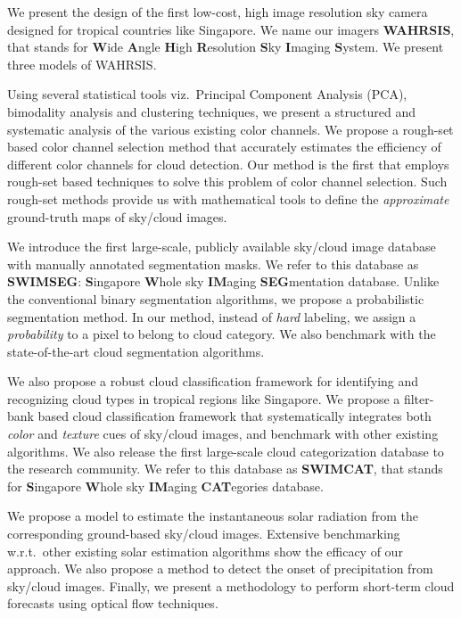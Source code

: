 We present the design of the first low-cost, high image resolution sky camera designed for tropical countries like Singapore. We name our imagers \textbf{WAHRSIS}, that stands for \textbf{W}ide \textbf{A}ngle \textbf{H}igh \textbf{R}esolution \textbf{S}ky \textbf{I}maging \textbf{S}ystem. We present three models of WAHRSIS.

Using several statistical tools viz.\ Principal Component Analysis (PCA), bimodality analysis and clustering techniques, we present a structured and systematic analysis of the various existing color channels. We propose a rough-set based color channel selection method that accurately estimates the efficiency of different color channels for cloud detection. Our method is the first that employs rough-set based techniques to solve this problem of color channel selection. Such rough-set methods provide us with mathematical tools to define the \emph{approximate} ground-truth maps of sky/cloud images.

We introduce the first large-scale, publicly available sky/cloud image database with manually annotated segmentation masks. We refer to this database as \textbf{SWIMSEG}: \textbf{S}ingapore \textbf{W}hole sky \textbf{IM}aging \textbf{SEG}mentation database. Unlike the conventional binary segmentation algorithms, we propose a probabilistic segmentation method. In our method, instead of \emph{hard} labeling, we assign a \emph{probability} to a pixel to belong to cloud category. We also benchmark with the state-of-the-art cloud segmentation algorithms. 

We also propose a robust cloud classification framework for identifying and recognizing cloud types in tropical regions like Singapore. We propose a filter-bank based cloud classification framework that systematically integrates both \emph{color} and \emph{texture} cues of sky/cloud images, and benchmark with other existing algorithms. We also release the first large-scale cloud categorization database to the research community. We refer to this database as \textbf{SWIMCAT}, that stands for \textbf{S}ingapore \textbf{W}hole sky \textbf{IM}aging \textbf{CAT}egories database.

We propose a model to estimate the instantaneous solar radiation from the corresponding ground-based sky/cloud images. Extensive benchmarking w.r.t.\ other existing solar estimation algorithms show the efficacy of our approach. We also propose a method to detect the onset of precipitation from sky/cloud images. Finally, we present a methodology to perform short-term cloud forecasts using optical flow techniques.

